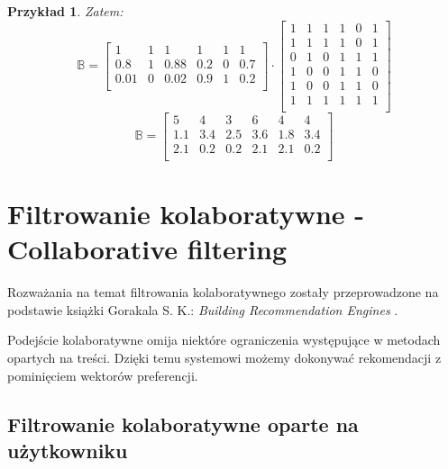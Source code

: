 \documentclass[12pt,a4paper]{report}
\newtheorem{przyklad}{Przykład}[chapter]{\normalfont}
\begin{document}
\begin{przyklad}
Zatem:
$$
\mathbb{B} = \left[
        \begin{array}{cccccc}
         1 & 1 & 1 & 1 & 1 & 1 \\
         0.8 & 1 & 0.88 & 0.2 & 0 & 0.7 \\
         0.01 & 0 & 0.02 & 0.9 & 1 & 0.2 \\
         \end{array}
      \right] \cdot \left[
        \begin{array}{cccccc}
         1 & 1 & 1 & 1 & 0 & 1 \\
         1 & 1 & 1 & 1 & 0 & 1 \\
         0 & 1 & 0 & 1 & 1 & 1 \\
         1 & 0 & 0 & 1 & 1 & 0 \\
         1 & 0 & 0 & 1 & 1 & 0 \\
         1 & 1 & 1 & 1 & 1 & 1 \\
         \end{array}
      \right] $$
      $$ \mathbb{B} = \left[
        \begin{array}{cccccc}
         5 & 4 & 3 & 6 & 4 & 4 \\
         1.1 & 3.4 & 2.5 & 3.6 & 1.8 & 3.4 \\
         2.1 & 0.2 & 0.2 & 2.1 & 2.1 & 0.2 \\
         \end{array}
      \right]$$

\end{przyklad}


\section{Filtrowanie kolaboratywne - Collaborative filtering}
Rozważania na temat filtrowania kolaboratywnego zostały przeprowadzone na podstawie książki Gorakala S. K.: \textit{Building Recommendation Engines} {\citep[Sec 3]{bre}}.
\bigskip

Podejście kolaboratywne omija niektóre ograniczenia występujące w metodach opartych na treści. Dzięki temu systemowi możemy dokonywać rekomendacji z pominięciem wektorów preferencji. 

\subsection{Filtrowanie kolaboratywne oparte na użytkowniku}
\end{document}
